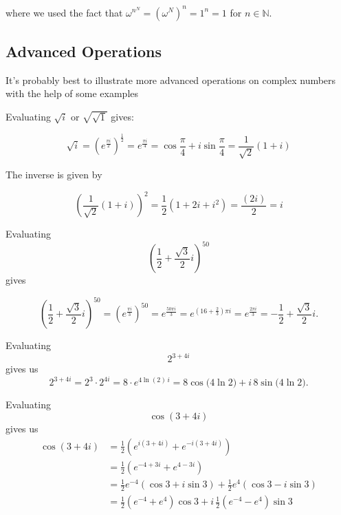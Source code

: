 \documentclass[12pt]{article}
\begin{document}
where we used the fact that $\omega^{n^N} = \left(\omega^N\right)^n = 1^n = 1$ for $n \in \mathbb{N}$.

\subsection{Advanced Operations}

It's probably best to illustrate more advanced operations on complex numbers with the help of some examples

\begin{example}
    Evaluating $\sqrt{i}$ or $\sqrt{\sqrt{1}}$ gives:

    $$\sqrt{i} = \left(e^{\frac{\pi i}{2}}\right)^{\frac{1}{2}} = e^{\frac{\pi i }{4}} = \cos \frac{\pi}{4} + i \sin \frac{\pi}{4} = \frac{1}{\sqrt{2}} (1 + i)$$

    The inverse is given by

    $$\left(\frac{1}{\sqrt{2}} (1 + i)\right)^2 = \frac{1}{2}(1 + 2i + i^2) = \frac{(2i)}{2} = i$$
\end{example}


\begin{example}
    Evaluating $$ \left(\frac{1}{2}+\frac{\sqrt{3}}{2}i\right)^{50} $$ gives

    $$
    \left(\frac{1}{2}+\frac{\sqrt{3}}{2}i\right)^{50}
    =\left(e^{\frac{\pi i}{3}}\right)^{50}
    =e^{\frac{50\pi i}{3}}
    =e^{\left(16+\frac{2}{3}\right)\pi i}
    =e^{\frac{2\pi i}{3}}
    =-\frac{1}{2}+\frac{\sqrt{3}}{2}i.
    $$
\end{example}


\begin{example}
    Evaluating $$2^{3+4i}$$ gives us
    $$
    2^{3+4i}=2^3\cdot 2^{4i}=8\cdot e^{4\ln(2)\,i}
    =8\cos\!\big(4\ln 2\big)+i\,8\sin\!\big(4\ln 2\big).
    $$

\end{example}

\begin{example}
    Evaluating $$\cos(3+4i)$$
    gives us
    \begin{align*}
        \cos(3+4i) &= \frac{1}{2}\!\left(e^{i(3+4i)}+e^{-i(3+4i)}\right) \\
        &= \frac{1}{2}\!\left(e^{-4+3i}+e^{4-3i}\right) \\
        &= \frac{1}{2}e^{-4}(\cos 3+i\sin 3)+\frac{1}{2}e^{4}(\cos 3-i\sin 3) \\
        &= \frac{1}{2}(e^{-4}+e^{4})\cos 3+i\,\frac{1}{2}(e^{-4}-e^{4})\sin 3 \\     
    \end{align*}

\end{example}
\end{document}
